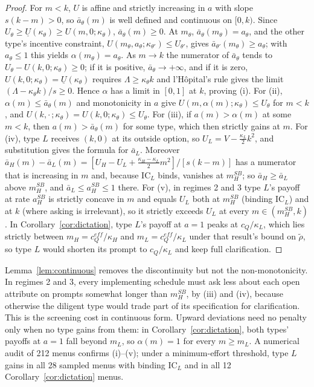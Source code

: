 \documentclass[11pt]{article}
\begin{document}
\begin{proof}
For $m < k$, $U$ is affine and strictly increasing in $a$ with slope $s(k-m) > 0$, so $\bar a_\theta(m)$ is well defined and continuous on $[0,k)$. Since $U_\theta \ge \underline U(\kappa_\theta) \ge U(m,0;\kappa_\theta)$, $\bar a_\theta(m) \ge 0$. At $m_\theta$, $\bar a_\theta(m_\theta) = a_\theta$, and the other type's incentive constraint, $U(m_\theta,a_\theta;\kappa_{\theta'}) \le U_{\theta'}$, gives $\bar a_{\theta'}(m_\theta) \ge a_\theta$; with $a_\theta \le 1$ this yields $\alpha(m_\theta) = a_\theta$. As $m \to k$ the numerator of $\bar a_\theta$ tends to $U_\theta - U(k,0;\kappa_\theta) \ge 0$; if it is positive, $\bar a_\theta \to +\infty$, and if it is zero, $U(k,0;\kappa_\theta) = \underline U(\kappa_\theta)$ requires $\Lambda \ge \kappa_\theta k$ and l'H\^opital's rule gives the limit $(\Lambda - \kappa_\theta k)/s \ge 0$. Hence $\alpha$ has a limit in $[0,1]$ at $k$, proving (i). For (ii), $\alpha(m) \le \bar a_\theta(m)$ and monotonicity in $a$ give $U(m,\alpha(m);\kappa_\theta) \le U_\theta$ for $m < k$, and $U(k,\cdot\,;\kappa_\theta) = U(k,0;\kappa_\theta) \le U_\theta$. For (iii), if $a(m) > \alpha(m)$ at some $m < k$, then $a(m) > \bar a_\theta(m)$ for some type, which then strictly gains at $m$. For (iv), type $L$ receives $(k,0)$ at its outside option, so $U_L = V - \frac{\kappa_L}{2}k^2$, and substitution gives the formula for $\bar a_L$. Moreover $\bar a_H(m) - \bar a_L(m) = [U_H - U_L + \frac{\kappa_H - \kappa_L}{2}m^2]/[s(k-m)]$ has a numerator that is increasing in $m$ and, because $\text{IC}_L$ binds, vanishes at $m_H^{SB}$; so $\bar a_H \ge \bar a_L$ above $m_H^{SB}$, and $\bar a_L \le a_H^{SB} \le 1$ there. For (v), in regimes 2 and 3 type $L$'s payoff at rate $a_H^{SB}$ is strictly concave in $m$ and equals $U_L$ both at $m_H^{SB}$ (binding $\text{IC}_L$) and at $k$ (where asking is irrelevant), so it strictly exceeds $U_L$ at every $m \in (m_H^{SB}, k)$. In Corollary~\ref{cor:dictation}, type $L$'s payoff at $a = 1$ peaks at $c_Q/\kappa_L$, which lies strictly between $m_H = c_Q^{eff}/\kappa_H$ and $m_L = c_Q^{eff}/\kappa_L$ under that result's bound on $\tilde\rho$, so type $L$ would shorten its prompt to $c_Q/\kappa_L$ and keep full clarification.
\end{proof}

Lemma~\ref{lem:continuous} removes the discontinuity but not the non-monotonicity. In regimes 2 and 3, every implementing schedule must ask less about each open attribute on prompts somewhat longer than $m_H^{SB}$, by (iii) and (iv), because otherwise the diligent type would trade part of its specification for clarification. This is the screening cost in continuous form. Upward deviations need no penalty only when no type gains from them: in Corollary~\ref{cor:dictation}, both types' payoffs at $a = 1$ fall beyond $m_L$, so $\alpha(m) = 1$ for every $m \ge m_L$. A numerical audit of 212 menus confirms (i)--(v); under a minimum-effort threshold, type $L$ gains in all 28 sampled menus with binding $\text{IC}_L$ and in all 12 Corollary~\ref{cor:dictation} menus.
\end{document}
